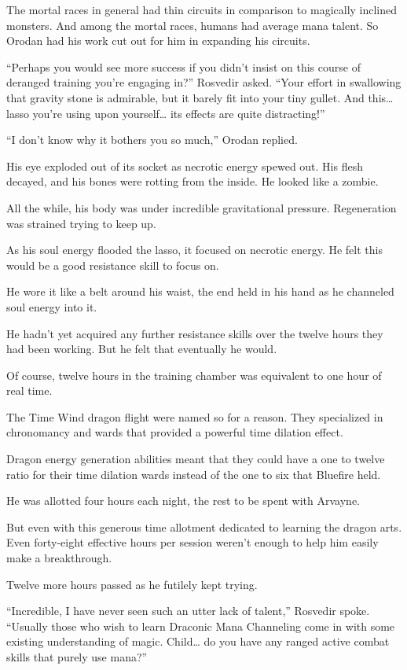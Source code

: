 \documentclass[a4paper,10pt]{book}
\begin{document}
The mortal races in general had thin circuits in comparison to magically inclined monsters. And among the mortal races, humans had average mana talent. So Orodan had his work cut out for him in expanding his circuits.\par
“Perhaps you would see more success if you didn’t insist on this course of deranged training you’re engaging in?” Rosvedir asked. “Your effort in swallowing that gravity stone is admirable, but it barely fit into your tiny gullet. And this… lasso you’re using upon yourself… its effects are quite distracting!”\par
“I don’t know why it bothers you so much,” Orodan replied.\par
His eye exploded out of its socket as necrotic energy spewed out. His flesh decayed, and his bones were rotting from the inside. He looked like a zombie.\par
All the while, his body was under incredible gravitational pressure. Regeneration was strained trying to keep up.\par
As his soul energy flooded the lasso, it focused on necrotic energy. He felt this would be a good resistance skill to focus on.\par
He wore it like a belt around his waist, the end held in his hand as he channeled soul energy into it.\par
He hadn’t yet acquired any further resistance skills over the twelve hours they had been working. But he felt that eventually he would.\par
Of course, twelve hours in the training chamber was equivalent to one hour of real time.\par
The Time Wind dragon flight were named so for a reason. They specialized in chronomancy and wards that provided a powerful time dilation effect.\par
Dragon energy generation abilities meant that they could have a one to twelve ratio for their time dilation wards instead of the one to six that Bluefire held.\par
He was allotted four hours each night, the rest to be spent with Arvayne.\par
But even with this generous time allotment dedicated to learning the dragon arts. Even forty-eight effective hours per session weren’t enough to help him easily make a breakthrough.\par
Twelve more hours passed as he futilely kept trying.\par
“Incredible, I have never seen such an utter lack of talent,” Rosvedir spoke. “Usually those who wish to learn Draconic Mana Channeling come in with some existing understanding of magic. Child… do you have any ranged active combat skills that purely use mana?”\par
\end{document}
